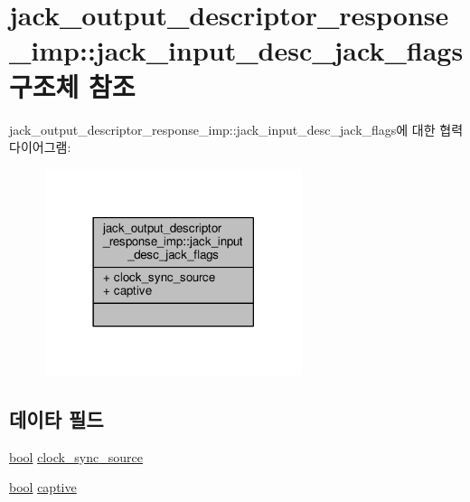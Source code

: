 \hypertarget{structavdecc__lib_1_1jack__output__descriptor__response__imp_1_1jack__input__desc__jack__flags}{}\section{jack\+\_\+output\+\_\+descriptor\+\_\+response\+\_\+imp\+:\+:jack\+\_\+input\+\_\+desc\+\_\+jack\+\_\+flags 구조체 참조}
\label{structavdecc__lib_1_1jack__output__descriptor__response__imp_1_1jack__input__desc__jack__flags}


jack\+\_\+output\+\_\+descriptor\+\_\+response\+\_\+imp\+:\+:jack\+\_\+input\+\_\+desc\+\_\+jack\+\_\+flags에 대한 협력 다이어그램\+:
\nopagebreak
\begin{figure}[H]
\begin{center}
\leavevmode
\includegraphics[width=213pt]{structavdecc__lib_1_1jack__output__descriptor__response__imp_1_1jack__input__desc__jack__flags__coll__graph}
\end{center}
\end{figure}
\subsection*{데이타 필드}
\begin{DoxyCompactItemize}
\item 
\hyperlink{avb__gptp_8h_af6a258d8f3ee5206d682d799316314b1}{bool} \hyperlink{structavdecc__lib_1_1jack__output__descriptor__response__imp_1_1jack__input__desc__jack__flags_a88fddf8263d330f180256cd941f9a329}{clock\+\_\+sync\+\_\+source}
\item 
\hyperlink{avb__gptp_8h_af6a258d8f3ee5206d682d799316314b1}{bool} \hyperlink{structavdecc__lib_1_1jack__output__descriptor__response__imp_1_1jack__input__desc__jack__flags_a5402c79a5c779cdf48abab5879fb8de4}{captive}
\end{DoxyCompactItemize}


